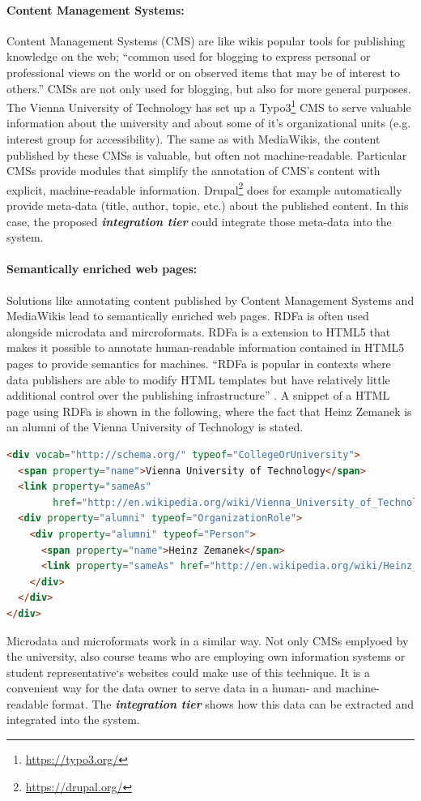 \documentclass{article}
\begin{document}
\paragraph{Content Management Systems:} Content Management Systems (CMS) are like wikis popular tools for publishing knowledge on the web; \enquote{common used for blogging to express personal or professional views on the world or on observed items that may be of interest to others.}\cite{bojars_using_2006} CMSs are not only used for blogging, but also for more general purposes. The Vienna University of Technology has set up a Typo3\footnote{\url{https://typo3.org/}} CMS to serve valuable information about the university and about some of it’s organizational units (e.g. interest group for accessibility). The same as with MediaWikis, the content published by these CMSs is valuable, but often not machine-readable. Particular CMSs provide modules that simplify the annotation of CMS’s content with explicit, machine-readable information. Drupal\footnote{\url{https://drupal.org/}} does for example automatically provide meta-data (title, author, topic, etc.) about the published content. In this case, the proposed \textbf{\textit{integration tier}} could integrate those meta-data into the system.

\paragraph{Semantically enriched web pages:} Solutions like annotating content published by Content Management Systems and MediaWikis lead to semantically enriched web pages. RDFa is often used alongside microdata and mircroformats. RDFa is a extension to HTML5 that makes it possible to annotate human-readable information contained in HTML5 pages to provide semantics for machines. \enquote{RDFa is popular in contexts where data publishers are able to modify HTML templates but have relatively little additional control over the publishing infrastructure} \cite{heath_linked_2011}. A snippet of a HTML page using RDFa is shown in the following, where the fact that Heinz Zemanek is an alumni of the Vienna University of Technology is stated.

\begin{lstlisting}[basicstyle=\tiny, language=html, frame=single] 
<div vocab="http://schema.org/" typeof="CollegeOrUniversity">
  <span property="name">Vienna University of Technology</span>
  <link property="sameAs"
        href="http://en.wikipedia.org/wiki/Vienna_University_of_Technology"/>
  <div property="alumni" typeof="OrganizationRole">
    <div property="alumni" typeof="Person">
      <span property="name">Heinz Zemanek</span>
      <link property="sameAs" href="http://en.wikipedia.org/wiki/Heinz_Zemanek"/>
    </div>
  </div>
</div>
\end{lstlisting}
Microdata and microformats work in a similar way. Not only CMSs emplyoed by the university, also course teams who are employing own information systems or student representative`s websites could  make use of this technique. It is a convenient way for the data owner to serve data in a human- and machine-readable format. The \textbf{\textit{integration tier}} shows how this data can be extracted and integrated into the system.
\end{document}

